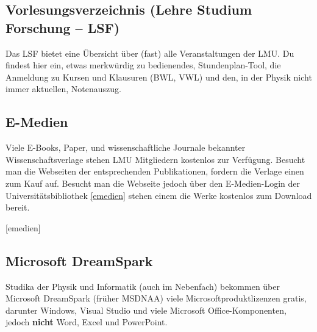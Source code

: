 \begin{urlList}
\end{urlList}

\subsection*{Vorlesungsverzeichnis (Lehre Studium Forschung -- LSF)}

Das LSF bietet eine Übersicht über (fast) alle Veranstaltungen der LMU. Du findest hier ein, etwas merkwürdig zu bedienendes, Stundenplan-Tool, die Anmeldung zu Kursen und Klausuren (BWL, VWL) und den, in der Physik nicht immer aktuellen, Notenauszug.


\begin{urlList}
\end{urlList}


\subsection*{E-Medien}
Viele E-Books, Paper, und wissenschaftliche Journale bekannter Wissenschaftsverlage stehen LMU Mitgliedern kostenlos zur Verfügung.
Besucht man die Webseiten der entsprechenden Publikationen, fordern die Verlage einen zum Kauf auf.
Besucht man die Webseite jedoch über den E-Medien-Login der Universitätsbibliothek \ref{emedien} stehen einem die Werke kostenlos zum Download bereit.
\begin{urlList}
	[emedien]
\end{urlList}

\subsection*{Microsoft DreamSpark \subjectList{\subjectI{}\subjectMI{}\subjectP{}}}
Studika der Physik und Informatik (auch im Nebenfach) bekommen über
Microsoft DreamSpark (früher MSDNAA) viele Microsoftproduktlizenzen
gratis, darunter Windows, Visual Studio und viele
Microsoft Office-Komponenten, jedoch \textbf{nicht} Word, Excel und PowerPoint.

